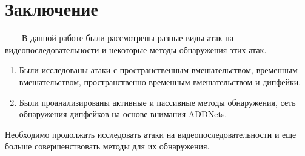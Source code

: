 \documentclass[12pt]{article}
\begin{document}
    \section {Заключение}
        $\qquad$В данной работе были рассмотрены разные виды атак на видеопоследовательности и некоторые методы обнаружения этих атак.
        \begin{enumerate}
            \item Были исследованы атаки с пространственным вмешательством, временным вмешательством, пространственно-временным вмешательством и дипфейки.
            \item Были проанализированы активные и пассивные методы обнаружения, сеть обнаружения дипфейков на основе внимания ADDNets.
        \end{enumerate}
        \newline
        Необходимо продолжать исследовать атаки на видеопоследовательности и еще больше совершенствовать методы для их обнаружения.
    \newpage
\end{document}
